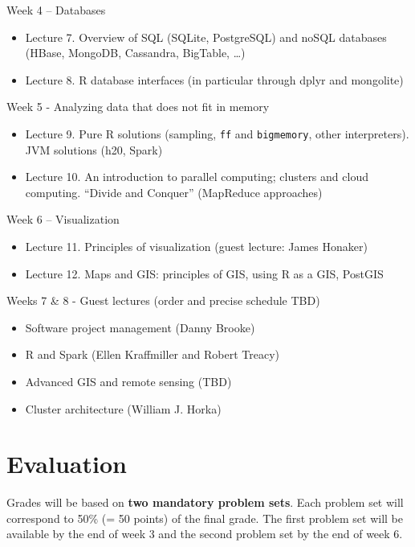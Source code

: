 \documentclass[]{book}
\providecommand{\tightlist}{%
  \setlength{\itemsep}{0pt}\setlength{\parskip}{0pt}}
\theoremstyle{definition}
\theoremstyle{definition}
\theoremstyle{definition}
\theoremstyle{remark}
\begin{document}
Week 4 -- Databases

\begin{itemize}
\tightlist
\item
  Lecture 7. Overview of SQL (SQLite, PostgreSQL) and noSQL databases
  (HBase, MongoDB, Cassandra, BigTable, \ldots{})
\item
  Lecture 8. R database interfaces (in particular through dplyr and
  mongolite)
\end{itemize}

Week 5 - Analyzing data that does not fit in memory

\begin{itemize}
\tightlist
\item
  Lecture 9. Pure R solutions (sampling, \texttt{ff} and
  \texttt{bigmemory}, other interpreters). JVM solutions (h20, Spark)
\item
  Lecture 10. An introduction to parallel computing; clusters and cloud
  computing. ``Divide and Conquer'' (MapReduce approaches)
\end{itemize}

Week 6 -- Visualization

\begin{itemize}
\tightlist
\item
  Lecture 11. Principles of visualization (guest lecture: James Honaker)
\item
  Lecture 12. Maps and GIS: principles of GIS, using R as a GIS, PostGIS
\end{itemize}

Weeks 7 \& 8 - Guest lectures (order and precise schedule TBD)

\begin{itemize}
\tightlist
\item
  Software project management (Danny Brooke)
\item
  R and Spark (Ellen Kraffmiller and Robert Treacy)
\item
  Advanced GIS and remote sensing (TBD)
\item
  Cluster architecture (William J. Horka)
\end{itemize}

\section{Evaluation}\label{evaluation}

Grades will be based on \textbf{two mandatory problem sets}. Each
problem set will correspond to 50\% (= 50 points) of the final grade.
The first problem set will be available by the end of week 3 and the
second problem set by the end of week 6.
\end{document}
